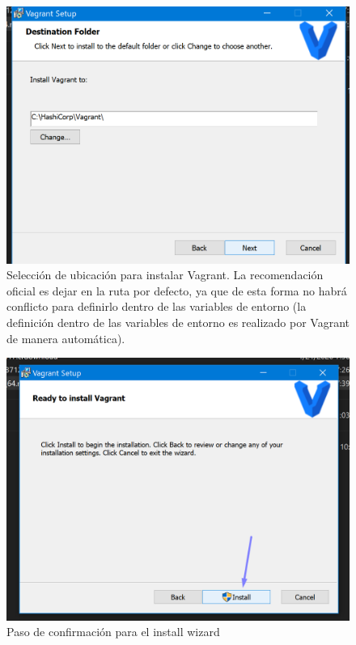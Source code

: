\documentclass[letterpaper, 12pt, oneside]{article}
\begin{document}
    \begin{center}
    \begin{figure}[H]
        \includegraphics[scale=1.0]{img/install/vagrant3.png}
        \caption{Selección de ubicación para instalar Vagrant. La recomendación oficial es dejar en la ruta por defecto, ya que de esta forma no habrá conflicto para definirlo dentro de las variables de entorno (la definición dentro de las variables de entorno es realizado por Vagrant de manera automática).}
        \label{fig:va3}
    \end{figure}
    

     \begin{figure}[H]
        \includegraphics[scale=0.9]{img/install/vagrant4.png}
        \caption{Paso de confirmación para el install wizard}
        \label{fig:va4}
    \end{figure}
    

\end{center}
\end{document}
